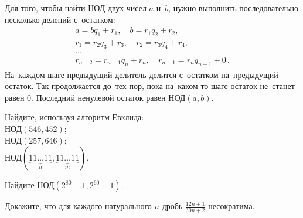 Для того, чтобы найти НОД двух чисел $a$ и~$b$, нужно выполнить последовательно
несколько делений с~остатком:
\begin{gather*}
    a = b q_1 + r_1
, \quad
    b = r_1 q_2 + r_2
, \\
    r_1 = r_2 q_3 + r_3
, \quad
    r_2 = r_3 q_4 + r_4
, \\ \ldots \\
    r_{n-2} = r_{n-1} q_n + r_n
, \quad
    r_{n-1} = r_n q_{n+1} + 0
\,.\end{gather*}
На~каждом шаге предыдущий делитель делится с~остатком на~предыдущий остаток.
Так продолжается до~тех пор, пока на~каком-то шаге остаток не~станет равен 0.
Последний ненулевой остаток равен $\text{НОД}(a, b)$.

\begin{problems}

\item
Найдите, используя алгоритм Евклида:
\\
\sp $\text{НОД}(546, 452)$;
\\
\sp $\text{НОД}(257, 646)$;
\\
\sp
\(
    \text{НОД} (
        \underbrace{11 \ldots 11}_{n},
        \underbrace{11 \ldots 11}_{m}
    )
\).



\item
Найдите $\text{НОД}(2^{80} - 1,  2^{60} - 1)$.

\item
Докажите, что для каждого натурального $n$ дробь $\frac{12 n + 1}{30 n + 2}$
несократима.




\end{problems}
